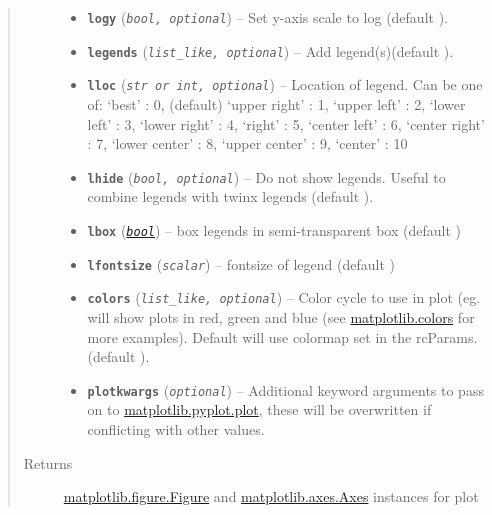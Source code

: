\documentclass[letterpaper,10pt,english]{sphinxhowto}
\begin{document}
\begin{fulllineitems}
\begin{quote}
\begin{description}
\begin{itemize}
\item {} 
\textbf{\texttt{logy}} (\emph{\texttt{bool, optional}}) -- Set y-axis scale to log (default ).

\item {} 
\textbf{\texttt{legends}} (\emph{\texttt{list\_like, optional}}) -- Add legend(s)(default \code{{[}{]}}).

\item {} 
\textbf{\texttt{lloc}} (\emph{\texttt{str or int, optional}}) -- Location of legend. Can be one of:
`best' : 0, (default)
`upper right'  : 1,
`upper left'   : 2,
`lower left'   : 3,
`lower right'  : 4,
`right'        : 5,
`center left'  : 6,
`center right' : 7,
`lower center' : 8,
`upper center' : 9,
`center'       : 10

\item {} 
\textbf{\texttt{lhide}} (\emph{\texttt{bool, optional}}) -- Do not show legends. Useful to combine legends with twinx legends
(default ).

\item {} 
\textbf{\texttt{lbox}} (\href{https://docs.python.org/library/functions.html\#bool}{\emph{\texttt{bool}}}) -- box legends in semi-transparent box (default )

\item {} 
\textbf{\texttt{lfontsize}} (\emph{\texttt{scalar}}) -- fontsize of legend (default )

\item {} 
\textbf{\texttt{colors}} (\emph{\texttt{list\_like, optional}}) -- Color cycle to use in plot (eg. \code{{[}'r','g','b'{]}} will show plots
in red, green and blue (see
\href{http://matplotlib.org/api/colors\_api.html}{matplotlib.colors}
for more examples). Default will use colormap set in the rcParams.
(default \code{{[}{]}}).

\item {} 
\textbf{\texttt{plotkwargs}} (\emph{\texttt{optional}}) -- Additional keyword arguments to pass on to
\href{http://matplotlib.org/api/pyplot\_api.html\#matplotlib.pyplot.plot}{matplotlib.pyplot.plot}, these will be overwritten if conflicting
with other values.

\end{itemize}

\item[{Returns}] \leavevmode
\href{http://matplotlib.org/api/figure\_api.html\#matplotlib.figure.Figure}{matplotlib.figure.Figure}
and
\href{http://matplotlib.org/api/axes\_api.html\#matplotlib.axes.Axes}{matplotlib.axes.Axes}
instances for plot


\end{description}
\end{quote}
\end{fulllineitems}
\end{document}
